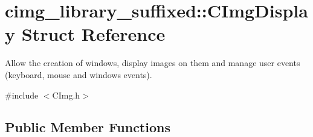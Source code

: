 \hypertarget{structcimg__library__suffixed_1_1CImgDisplay}{}\section{cimg\+\_\+library\+\_\+suffixed\+:\+:C\+Img\+Display Struct Reference}
\label{structcimg__library__suffixed_1_1CImgDisplay}


Allow the creation of windows, display images on them and manage user events (keyboard, mouse and windows events).  




{\ttfamily \#include $<$C\+Img.\+h$>$}

\subsection*{Public Member Functions}
